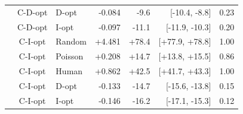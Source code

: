 \begin{tabular}{cclrrrr}
 & C-D-opt & D-opt & -0.084 & -9.6 & [-10.4, -8.8] & 0.23 \\
 & C-D-opt & I-opt & -0.097 & -11.1 & [-11.9, -10.3] & 0.20 \\
 & C-I-opt & Random & +4.481 & +78.4 & [+77.9, +78.8] & 1.00 \\
 & C-I-opt & Poisson & +0.208 & +14.7 & [+13.8, +15.5] & 0.86 \\
 & C-I-opt & Human & +0.862 & +42.5 & [+41.7, +43.3] & 1.00 \\
 & C-I-opt & D-opt & -0.133 & -14.7 & [-15.6, -13.8] & 0.15 \\
 & C-I-opt & I-opt & -0.146 & -16.2 & [-17.1, -15.3] & 0.12 \\
\bottomrule
\end{tabular}


